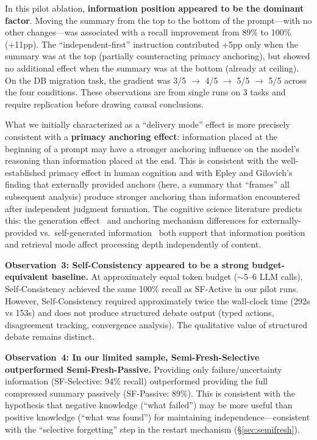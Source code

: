 \documentclass[11pt]{article}
\begin{document}
In this pilot ablation, \textbf{information position appeared to be the dominant factor}. Moving the summary from the top to the bottom of the prompt---with no other changes---was associated with a recall improvement from 89\% to 100\% (+11pp). The ``independent-first'' instruction contributed +5pp only when the summary was at the top (partially counteracting primacy anchoring), but showed no additional effect when the summary was at the bottom (already at ceiling). On the DB migration task, the gradient was 3/5 $\to$ 4/5 $\to$ 5/5 $\to$ 5/5 across the four conditions. These observations are from single runs on 3 tasks and require replication before drawing causal conclusions.

What we initially characterized as a ``delivery mode'' effect is more precisely consistent with a \textbf{primacy anchoring effect}: information placed at the beginning of a prompt may have a stronger anchoring influence on the model's reasoning than information placed at the end. This is consistent with the well-established primacy effect in human cognition and with Epley and Gilovich's~\citep{epley2006anchoring} finding that externally provided anchors (here, a summary that ``frames'' all subsequent analysis) produce stronger anchoring than information encountered after independent judgment formation. The cognitive science literature predicts this: the generation effect~\citep{slamecka1978generation} and anchoring mechanism differences for externally-provided vs.\ self-generated information~\citep{epley2006anchoring} both support that information position and retrieval mode affect processing depth independently of content.

\textbf{Observation~3: Self-Consistency appeared to be a strong budget-equivalent baseline.} At approximately equal token budget ($\sim$5--6 LLM calls), Self-Consistency achieved the same 100\% recall as SF-Active in our pilot runs. However, Self-Consistency required approximately twice the wall-clock time (292s vs 153s) and does not produce structured debate output (typed actions, disagreement tracking, convergence analysis). The qualitative value of structured debate remains distinct.

\textbf{Observation~4: In our limited sample, Semi-Fresh-Selective outperformed Semi-Fresh-Passive.} Providing only failure/uncertainty information (SF-Selective: 94\% recall) outperformed providing the full compressed summary passively (SF-Passive: 89\%). This is consistent with the hypothesis that negative knowledge (``what failed'') may be more useful than positive knowledge (``what was found'') for maintaining independence---consistent with the ``selective forgetting'' step in the restart mechanism (\S\ref{sec:semifresh}).
\end{document}
